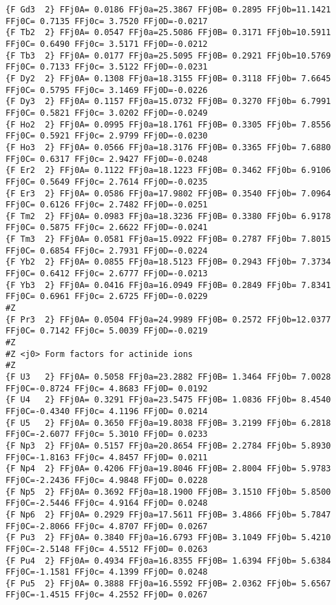 {\begin{verbatim}
{F Gd3  2} FFj0A= 0.0186 FFj0a=25.3867 FFj0B= 0.2895 FFj0b=11.1421 FFj0C= 0.7135 FFj0c= 3.7520 FFj0D=-0.0217 
{F Tb2  2} FFj0A= 0.0547 FFj0a=25.5086 FFj0B= 0.3171 FFj0b=10.5911 FFj0C= 0.6490 FFj0c= 3.5171 FFj0D=-0.0212 
{F Tb3  2} FFj0A= 0.0177 FFj0a=25.5095 FFj0B= 0.2921 FFj0b=10.5769 FFj0C= 0.7133 FFj0c= 3.5122 FFj0D=-0.0231 
{F Dy2  2} FFj0A= 0.1308 FFj0a=18.3155 FFj0B= 0.3118 FFj0b= 7.6645 FFj0C= 0.5795 FFj0c= 3.1469 FFj0D=-0.0226 
{F Dy3  2} FFj0A= 0.1157 FFj0a=15.0732 FFj0B= 0.3270 FFj0b= 6.7991 FFj0C= 0.5821 FFj0c= 3.0202 FFj0D=-0.0249 
{F Ho2  2} FFj0A= 0.0995 FFj0a=18.1761 FFj0B= 0.3305 FFj0b= 7.8556 FFj0C= 0.5921 FFj0c= 2.9799 FFj0D=-0.0230 
{F Ho3  2} FFj0A= 0.0566 FFj0a=18.3176 FFj0B= 0.3365 FFj0b= 7.6880 FFj0C= 0.6317 FFj0c= 2.9427 FFj0D=-0.0248 
{F Er2  2} FFj0A= 0.1122 FFj0a=18.1223 FFj0B= 0.3462 FFj0b= 6.9106 FFj0C= 0.5649 FFj0c= 2.7614 FFj0D=-0.0235 
{F Er3  2} FFj0A= 0.0586 FFj0a=17.9802 FFj0B= 0.3540 FFj0b= 7.0964 FFj0C= 0.6126 FFj0c= 2.7482 FFj0D=-0.0251 
{F Tm2  2} FFj0A= 0.0983 FFj0a=18.3236 FFj0B= 0.3380 FFj0b= 6.9178 FFj0C= 0.5875 FFj0c= 2.6622 FFj0D=-0.0241 
{F Tm3  2} FFj0A= 0.0581 FFj0a=15.0922 FFj0B= 0.2787 FFj0b= 7.8015 FFj0C= 0.6854 FFj0c= 2.7931 FFj0D=-0.0224 
{F Yb2  2} FFj0A= 0.0855 FFj0a=18.5123 FFj0B= 0.2943 FFj0b= 7.3734 FFj0C= 0.6412 FFj0c= 2.6777 FFj0D=-0.0213 
{F Yb3  2} FFj0A= 0.0416 FFj0a=16.0949 FFj0B= 0.2849 FFj0b= 7.8341 FFj0C= 0.6961 FFj0c= 2.6725 FFj0D=-0.0229 
#Z
{F Pr3  2} FFj0A= 0.0504 FFj0a=24.9989 FFj0B= 0.2572 FFj0b=12.0377 FFj0C= 0.7142 FFj0c= 5.0039 FFj0D=-0.0219 
#Z
#Z <j0> Form factors for actinide ions
#Z
{F U3   2} FFj0A= 0.5058 FFj0a=23.2882 FFj0B= 1.3464 FFj0b= 7.0028 FFj0C=-0.8724 FFj0c= 4.8683 FFj0D= 0.0192 
{F U4   2} FFj0A= 0.3291 FFj0a=23.5475 FFj0B= 1.0836 FFj0b= 8.4540 FFj0C=-0.4340 FFj0c= 4.1196 FFj0D= 0.0214 
{F U5   2} FFj0A= 0.3650 FFj0a=19.8038 FFj0B= 3.2199 FFj0b= 6.2818 FFj0C=-2.6077 FFj0c= 5.3010 FFj0D= 0.0233 
{F Np3  2} FFj0A= 0.5157 FFj0a=20.8654 FFj0B= 2.2784 FFj0b= 5.8930 FFj0C=-1.8163 FFj0c= 4.8457 FFj0D= 0.0211 
{F Np4  2} FFj0A= 0.4206 FFj0a=19.8046 FFj0B= 2.8004 FFj0b= 5.9783 FFj0C=-2.2436 FFj0c= 4.9848 FFj0D= 0.0228 
{F Np5  2} FFj0A= 0.3692 FFj0a=18.1900 FFj0B= 3.1510 FFj0b= 5.8500 FFj0C=-2.5446 FFj0c= 4.9164 FFj0D= 0.0248 
{F Np6  2} FFj0A= 0.2929 FFj0a=17.5611 FFj0B= 3.4866 FFj0b= 5.7847 FFj0C=-2.8066 FFj0c= 4.8707 FFj0D= 0.0267 
{F Pu3  2} FFj0A= 0.3840 FFj0a=16.6793 FFj0B= 3.1049 FFj0b= 5.4210 FFj0C=-2.5148 FFj0c= 4.5512 FFj0D= 0.0263 
{F Pu4  2} FFj0A= 0.4934 FFj0a=16.8355 FFj0B= 1.6394 FFj0b= 5.6384 FFj0C=-1.1581 FFj0c= 4.1399 FFj0D= 0.0248 
{F Pu5  2} FFj0A= 0.3888 FFj0a=16.5592 FFj0B= 2.0362 FFj0b= 5.6567 FFj0C=-1.4515 FFj0c= 4.2552 FFj0D= 0.0267 

\end{verbatim}}
